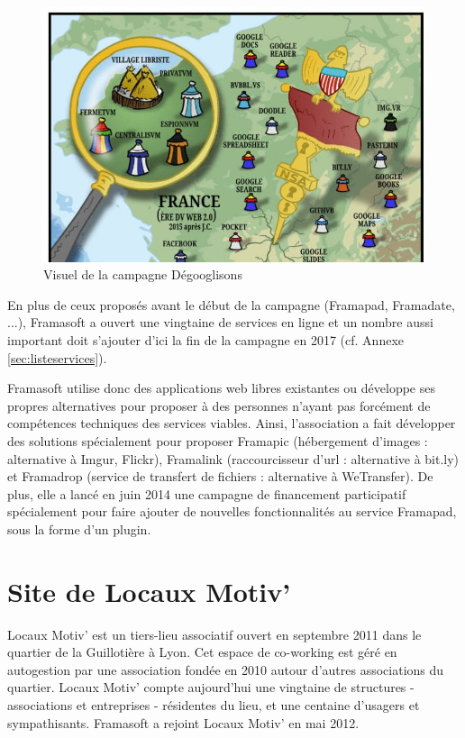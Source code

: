 \documentclass[10pt,a4paper, twoside]{report}
\begin{document}
	\begin{figure}[ht]
		\centerline{\includegraphics[width=1\textwidth]{images/degooglisons-internet.jpg}}
		\caption{Visuel de la campagne Dégooglisons}
		\label{visuel-campagne}
	\end{figure}

	
	En plus de ceux proposés avant le début de la campagne (Framapad, Framadate, ...), Framasoft a ouvert une vingtaine de services en ligne et un nombre aussi important doit s'ajouter d'ici la fin de la campagne en 2017 (cf. Annexe \ref{sec:listeservices}).
	
	Framasoft utilise donc des applications web libres existantes ou développe ses propres alternatives pour proposer à des personnes n'ayant pas forcément de compétences techniques des services viables.
	Ainsi, l'association a fait développer des solutions spécialement pour proposer Framapic (hébergement d'images : alternative à Imgur, Flickr), Framalink (raccourcisseur d'url : alternative à bit.ly) et Framadrop (service de transfert de fichiers : alternative à WeTransfer). De plus, elle a lancé en juin 2014 une campagne de financement participatif spécialement pour faire ajouter de nouvelles fonctionnalités au service Framapad, sous la forme d'un plugin.
	
	\section{Site de Locaux Motiv'}
	Locaux Motiv' est un tiers-lieu associatif ouvert en septembre 2011 dans le quartier de la Guillotière à Lyon. Cet espace de co-working est géré en autogestion par une association fondée en 2010 autour d'autres associations du quartier.
	Locaux Motiv' compte aujourd’hui une vingtaine de structures - associations et entreprises - résidentes du lieu, et une centaine d'usagers et sympathisants. Framasoft a rejoint Locaux Motiv' en mai 2012.
	
\end{document}
